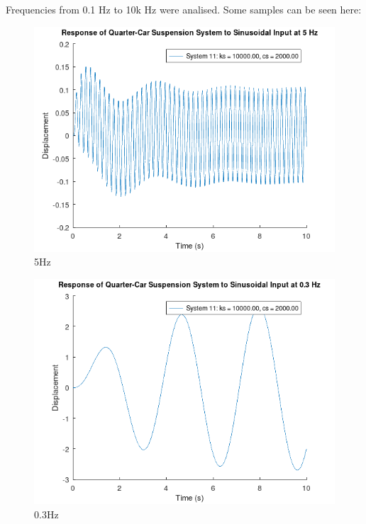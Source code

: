 \documentclass[11pt]{article}
\begin{document}
Frequencies from 0.1 Hz to 10k Hz were analised. Some samples can be seen here:
\begin{figure}[h]
    \centering
    \includegraphics[width=.9\linewidth]{ENG204-Assignment-2-Sinusoidal-f-5.png}
    \caption{5Hz}
    \label{fig:5hz}
\end{figure}
\begin{figure}[h]
    \centering
    \includegraphics[width=.9\linewidth]{ENG204-Assignment-2-Sinusoidal-f-0.3.png}
    \caption{0.3Hz}
    \label{fig:0.3hz}
\end{figure}
\end{document}
